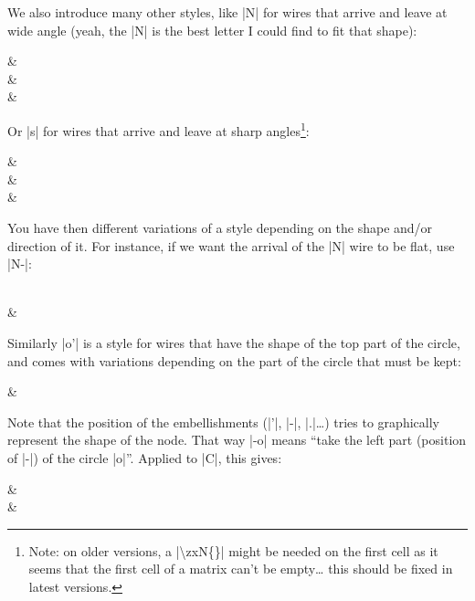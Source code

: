 \documentclass[a4paper,doc2]{ltxdoc} %
\begin{document}
We also introduce many other styles, like |N| for wires that arrive and leave at wide angle (yeah, the |N| is the best letter I could find to fit that shape):
\begin{codeexample}[]
\begin{ZX}
  \zxN{}                           & \zxZ{\beta}\\
  \zxZ{\alpha} \ar[ru,N] \ar[rd,N] &\\
                                   & \zxZ{\gamma}
\end{ZX}
\end{codeexample}
Or |s| for wires that arrive and leave at sharp angles\footnote{Note: on older versions, a |\textbackslash zxN\{\}| might be needed on the first cell as it seems that the first cell of a matrix can't be empty… this should be fixed in latest versions.}:
\begin{codeexample}[]
\begin{ZX}
                                   & \zxZ{\beta} \\
  \zxZ{\alpha} \ar[ru,s] \ar[rd,s] &             \\
                                   & \zxZ{\gamma}
\end{ZX}
\end{codeexample}
You have then different variations of a style depending on the shape and/or direction of it. For instance, if we want the arrival of the |N| wire to be flat, use |N-|:
\begin{codeexample}[]
\begin{ZX}
  \zxZ{\alpha} \ar[rd,N-] \\
                         & \zxZ{\beta}
\end{ZX}
\end{codeexample}
Similarly |o'| is a style for wires that have the shape of the top part of the circle, and comes with variations depending on the part of the circle that must be kept:
\begin{codeexample}[width=0pt]
\begin{ZX}
  \zxZ{\alpha} \ar[r,o',green] \ar[r,o.,red] \ar[d,o-,blue] \ar[d,-o,purple] & \zxZ{\beta}\\
  \zxZ{\beta}
\end{ZX}
\end{codeexample}
Note that the position of the embellishments (|'|, |-|, |.|\dots{}) tries to graphically represent the shape of the node. That way |-o| means ``take the left part (position of |-|) of the circle |o|''. Applied to |C|, this gives:
\begin{codeexample}[]
\begin{ZX}
  \zxX{} \ar[d,C] \ar[r,C']  & \zxZ{} \ar[d,C-]\\
  \zxZ{} \ar[r,C.]           & \zxX{}
\end{ZX}
\end{codeexample}
\end{document}

